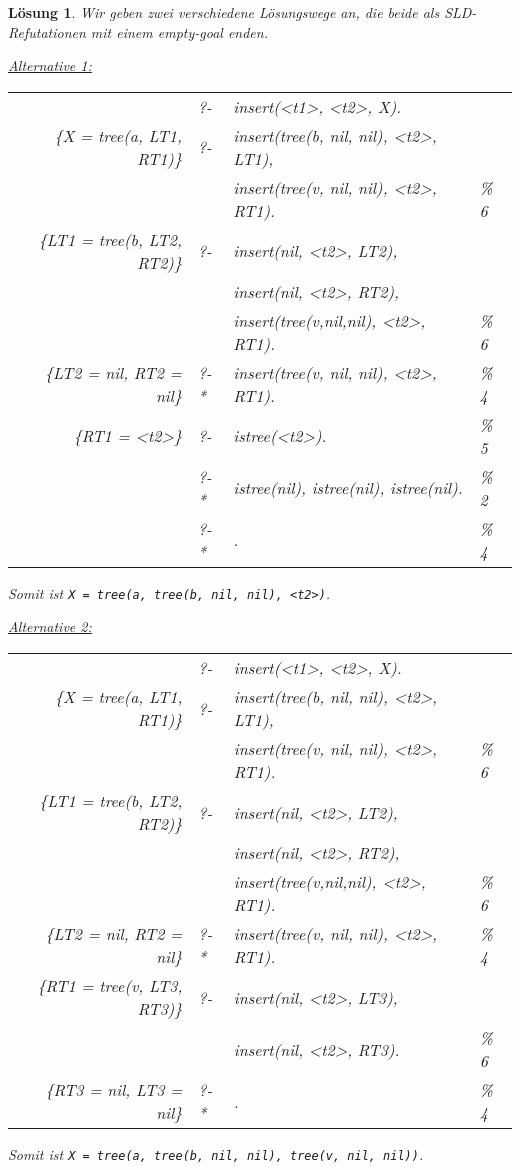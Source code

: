 \documentclass[ngerman,a4paper, 11pt]{scrartcl}
\theoremstyle{break}
\theoremstyle{nonumberplain}
\newtheorem{solution}{Lösung}
\begin{document}
\begin{solution}
	Wir geben zwei verschiedene Lösungswege an, die beide als SLD-Refutationen mit einem empty-goal enden.
	
	\underline{Alternative 1:}
	
	\begin{tabu}{>{\ttfamily}r >{\ttfamily}l >{\ttfamily}l >{\ttfamily}l}
		& ?- & insert(<t1>, <t2>, X). \\
		\{X = tree(a, LT1, RT1)\} & ?- & insert(tree(b, nil, nil), <t2>, LT1), \\
		&&insert(tree(v, nil, nil), <t2>, RT1). & \% 6 \\
		\{LT1 = tree(b, LT2, RT2)\} & ?- & insert(nil, <t2>, LT2), \\
		&& insert(nil, <t2>, RT2), \\
		&& insert(tree(v,nil,nil), <t2>, RT1). & \% 6 \\
		\{LT2 = nil, RT2 = nil\} & ?-* & insert(tree(v, nil, nil), <t2>, RT1). & \% 4 \\
		\{RT1 = <t2>\} & ?- & istree(<t2>). & \% 5 \\
		& ?-* & istree(nil), istree(nil), istree(nil). & \% 2 \\
		& ?-* &. & \% 4
	\end{tabu}

	Somit ist \texttt{X = tree(a, tree(b, nil, nil), <t2>)}.

	\underline{Alternative 2:}
	
	\begin{tabu}{>{\ttfamily}r >{\ttfamily}l >{\ttfamily}l >{\ttfamily}l}
		& ?- & insert(<t1>, <t2>, X). \\
		\{X = tree(a, LT1, RT1)\} & ?- & insert(tree(b, nil, nil), <t2>, LT1), \\
		&&insert(tree(v, nil, nil), <t2>, RT1). & \% 6 \\
		\{LT1 = tree(b, LT2, RT2)\} & ?- & insert(nil, <t2>, LT2), \\
		&& insert(nil, <t2>, RT2), \\
		&& insert(tree(v,nil,nil), <t2>, RT1). & \% 6 \\
		\{LT2 = nil, RT2 = nil\} & ?-* & insert(tree(v, nil, nil), <t2>, RT1). & \% 4 \\
		\{RT1 = tree(v, LT3, RT3)\} & ?- & insert(nil, <t2>, LT3), \\
		&& insert(nil, <t2>, RT3). & \% 6 \\
		\{RT3 = nil, LT3 = nil\} & ?-* & . & \% 4 
	\end{tabu}

	Somit ist \texttt{X = tree(a, tree(b, nil, nil), tree(v, nil, nil))}.
\end{solution}
\end{document}
